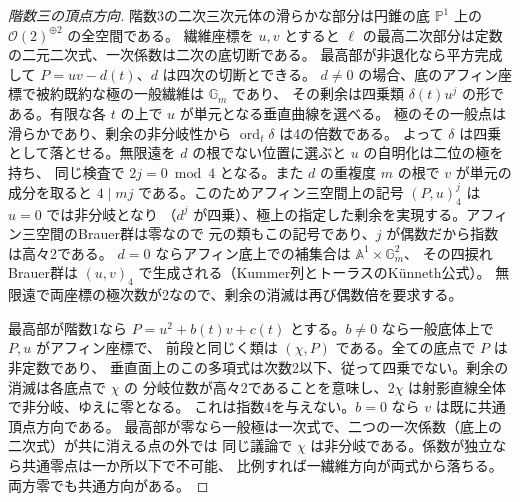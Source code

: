 \begin{proof}[階数三の頂点方向]
階数3の二次三次元体の滑らかな部分は円錐の底 $\mathbb P^1$ 上の $\mathcal O(2)^{\oplus2}$ の全空間である。
繊維座標を $u,v$ とすると $\ell$ の最高二次部分は定数の二元二次式、一次係数は二次の底切断である。
最高部が非退化なら平方完成して $P=uv-d(t)$、$d$ は四次の切断とできる。
$d\ne0$ の場合、底のアフィン座標で被約既約な極の一般繊維は $\mathbb G_m$ であり、
その剰余は四乗類 $\delta(t)u^j$ の形である。有限な各 $t$ の上で $u$ が単元となる垂直曲線を選べる。
極のその一般点は滑らかであり、剰余の非分岐性から $\operatorname{ord}_t\delta$ は4の倍数である。
よって $\delta$ は四乗として落とせる。無限遠を $d$ の根でない位置に選ぶと $u$ の自明化は二位の極を持ち、
同じ検査で $2j=0\bmod4$ となる。また $d$ の重複度 $m$ の根で $v$ が単元の成分を取ると
$4\mid mj$ である。このためアフィン三空間上の記号 $(P,u)_4^j$ は $u=0$ では非分岐となり
（$d^j$ が四乗）、極上の指定した剰余を実現する。アフィン三空間のBrauer群は零なので
元の類もこの記号であり、$j$ が偶数だから指数は高々2である。
$d=0$ ならアフィン底上での補集合は $\mathbb A^1\times\mathbb G_m^2$、
その四捩れBrauer群は $(u,v)_4$ で生成される（Kummer列とトーラスのKünneth公式）。
無限遠で両座標の極次数が2なので、剰余の消滅は再び偶数倍を要求する。

最高部が階数1なら $P=u^2+b(t)v+c(t)$ とする。$b\ne0$ なら一般底体上で $P,u$ がアフィン座標で、
前段と同じく類は $(\chi,P)$ である。全ての底点で $P$ は非定数であり、
垂直面上のこの多項式は次数2以下、従って四乗でない。剰余の消滅は各底点で $\chi$ の
分岐位数が高々2であることを意味し、$2\chi$ は射影直線全体で非分岐、ゆえに零となる。
これは指数4を与えない。$b=0$ なら $v$ は既に共通頂点方向である。
最高部が零なら一般極は一次式で、二つの一次係数（底上の二次式）が共に消える点の外では
同じ議論で $\chi$ は非分岐である。係数が独立なら共通零点は一か所以下で不可能、
比例すれば一繊維方向が両式から落ちる。両方零でも共通方向がある。
\end{proof}


